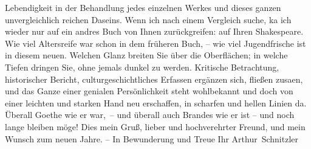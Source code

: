 \begin{ledgroupsized}[t]{13cm}
               Lebendigkeit in der Behandlung jedes einzelnen Werkes und dieses ganzen
               unvergleichlich reichen Daseins. Wenn ich nach einem Vergleich suche, ka{\geminationn} ich wieder nur auf ein andres Buch von Ihnen
               zurückgreifen: auf Ihren Shakespeare. Wie viel Altersreife war schon in dem früheren Buch, – wie viel Jugendfrische
                  \introOben{}ist\introOben{} in diesem neuen. Welchen Glanz breiten Sie über die
               Oberflächen; in welche Tiefen dringen Sie, ohne jemals dunkel zu werden. {\pb}Kritische Betrachtung, historischer Bericht,
               culturgeschichtliches Erfassen ergänzen sich, fließen zusa{\geminationm}en, und das Ganze einer genialen Persönlichkeit steht
               wohlbekannt und doch von einer leichten und starken Hand neu erschaffen, in scharfen
               und hellen Linien da. Überall Goethe wie er
               war, – und überall auch Brandes wie er ist – und noch lange bleiben möge! Dies mein
               Gruß, lieber und hochverehrter Freund, und mein Wunsch zum neuen Jahre. – In
               Bewunderung und Treue\pend
           \pstart Ihr \spacefill\mbox{Arthur Schnitzler}\pend{}
         
         \endnumbering{}\end{ledgroupsized}  \newcommand{\dateiname}{L02372}\newcommand{\titel}{Arthur Schnitzler an Georg Brandes, 28. 12. 1921}\newcommand{\editorInnen}{Martin Anton Müller und Gerd-Hermann Susen}
      